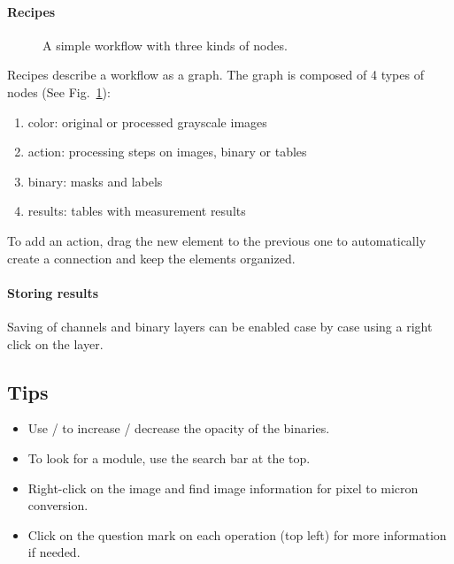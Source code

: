 \paragraph{Recipes}
\begin{figure}
    \centering \small
    \caption{A simple workflow with three kinds of nodes.}
    \label{fig:nodes}
\end{figure}

Recipes describe a workflow as a graph. The graph is composed of 4 types of nodes (See Fig.~\ref{fig:nodes}):
\begin{enumerate}\setlength\itemsep{0em}
    \item color: original or processed grayscale images
    \item action: processing steps on images, binary or tables
    \item binary: masks and labels
    \item results: tables with measurement results 
\end{enumerate}

To add an action, drag the new element to the previous one to automatically create a connection and keep the elements organized.

\paragraph{Storing results}

Saving of channels and binary layers can be enabled case by case using a right click on the layer. 

\subsection{Tips}
\begin{itemize}
    \item Use \keys{\Alt+\arrowkeyup} / \keys{\Alt+\arrowkeydown}  to increase / decrease the opacity of the binaries.
    \item To look for a module, use the search bar at the top.
    \item Right-click on the image and find image information for pixel to micron conversion.
    \item Click on the question mark on each operation (top left) for more information if needed.
\end{itemize}

